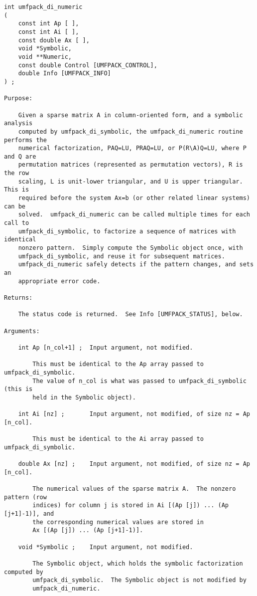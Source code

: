 \documentclass[11pt]{article}
\begin{document}
{\footnotesize
\begin{verbatim}
int umfpack_di_numeric
(
    const int Ap [ ],
    const int Ai [ ],
    const double Ax [ ],
    void *Symbolic,
    void **Numeric,
    const double Control [UMFPACK_CONTROL],
    double Info [UMFPACK_INFO]
) ;

Purpose:

    Given a sparse matrix A in column-oriented form, and a symbolic analysis
    computed by umfpack_di_symbolic, the umfpack_di_numeric routine performs the
    numerical factorization, PAQ=LU, PRAQ=LU, or P(R\A)Q=LU, where P and Q are
    permutation matrices (represented as permutation vectors), R is the row
    scaling, L is unit-lower triangular, and U is upper triangular.  This is
    required before the system Ax=b (or other related linear systems) can be
    solved.  umfpack_di_numeric can be called multiple times for each call to
    umfpack_di_symbolic, to factorize a sequence of matrices with identical
    nonzero pattern.  Simply compute the Symbolic object once, with
    umfpack_di_symbolic, and reuse it for subsequent matrices.
    umfpack_di_numeric safely detects if the pattern changes, and sets an
    appropriate error code.

Returns:

    The status code is returned.  See Info [UMFPACK_STATUS], below.

Arguments:

    int Ap [n_col+1] ;  Input argument, not modified.

        This must be identical to the Ap array passed to umfpack_di_symbolic.
        The value of n_col is what was passed to umfpack_di_symbolic (this is
        held in the Symbolic object).

    int Ai [nz] ;       Input argument, not modified, of size nz = Ap [n_col].

        This must be identical to the Ai array passed to umfpack_di_symbolic.

    double Ax [nz] ;    Input argument, not modified, of size nz = Ap [n_col].

        The numerical values of the sparse matrix A.  The nonzero pattern (row
        indices) for column j is stored in Ai [(Ap [j]) ... (Ap [j+1]-1)], and
        the corresponding numerical values are stored in
        Ax [(Ap [j]) ... (Ap [j+1]-1)].

    void *Symbolic ;    Input argument, not modified.

        The Symbolic object, which holds the symbolic factorization computed by
        umfpack_di_symbolic.  The Symbolic object is not modified by
        umfpack_di_numeric.


\end{verbatim}}
\end{document}
